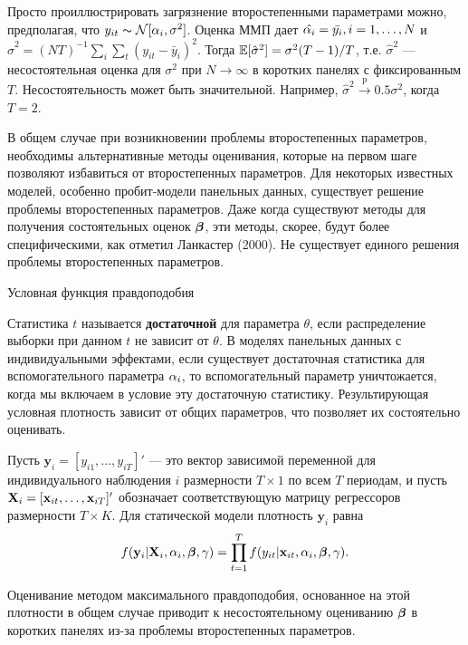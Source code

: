 Просто проиллюстрировать загрязнение второстепенными параметрами можно, предполагая, что $y_{it} \thicksim \mathcal{N}[\alpha_i, \sigma^2]$. Оценка ММП дает $\hat{\alpha_i}=\bar{y_i}, i=1, \dots, N$ и $\hat{\sigma}^2=(NT)^{-1}\sum_i \sum_t (y_{it}-\bar{y}_i)^2$. Тогда $\mathbb{E}[\hat{\sigma}^2]=\sigma^2(T-1)/T$, т.е. $\hat{\sigma}^2$ --- несостоятельная оценка для $\sigma^2$ при  $N \rightarrow \infty$ в коротких панелях с фиксированным $T$. Несостоятельность может быть значительной. Например, $\hat{\sigma}^2 \xrightarrow{\text{p}} 0.5 \sigma^2$, когда $T=2$.

В общем случае при возникновении проблемы второстепенных параметров, необходимы альтернативные методы оценивания, которые на первом шаге позволяют избавиться от второстепенных параметров. Для некоторых известных моделей, особенно пробит-модели панельных данных, существует решение проблемы второстепенных параметров. Даже когда  существуют методы для получения состоятельных оценок $\bm{\beta}$, эти методы, скорее, будут более специфическими, как отметил Ланкастер (2000). Не существует единого решения проблемы второстепенных параметров.

 {\centering Условная функция правдоподобия \\}

Статистика $t$  называется \textbf{достаточной} для параметра $\theta$, если распределение выборки при данном $t$ не зависит от $\theta$. В моделях панельных данных с индивидуальными эффектами, если существует достаточная статистика для вспомогательного параметра $\alpha_i$, то вспомогательный параметр уничтожается, когда мы включаем в условие эту достаточную статистику. Результирующая условная плотность зависит от общих параметров, что позволяет их состоятельно оценивать.

Пусть $\mathbf{y}_i=[y_{i1}, \dots, y_{iT}]'$ --- это вектор зависимой переменной для индивидуального наблюдения $i$ размерности $T \times 1$ по всем $T$ периодам, и пусть $\mathbf{X}_i=[\mathbf{x}_{it}, \dots, \mathbf{x}_{iT}]'$ обозначает соответствующую матрицу регрессоров размерности $T \times K$. Для статической модели плотность $\mathbf{y}_i$ равна
\begin{align}
f(\mathbf{y}_i|\mathbf{X}_i, \alpha_i, \bm{\beta}, \gamma)= \prod^T_{t=1} f(y_{it}|\mathbf{x}_{it}, \alpha_i, \bm{\beta}, \gamma).
\label{Eq:23.8}
\end{align}

Оценивание методом максимального правдоподобия, основанное на этой плотности в общем случае приводит к несостоятельному оцениванию $\bm{\beta}$ в коротких панелях из-за проблемы второстепенных параметров.

